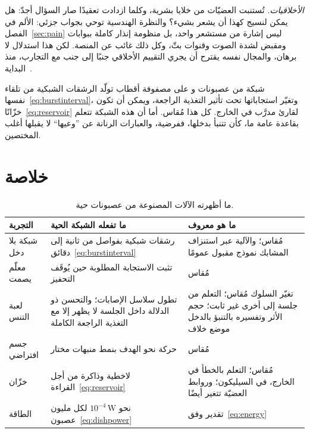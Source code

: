 \emph{الأخلاقيات.} تُستنبت العضيّات من خلايا بشرية، وكلما ازدادت تعقيدًا صار السؤال أجدّ: هل يمكن لنسيج كهذا أن يشعر بشيء؟ والنظرة الهندسية توحي بجواب جزئي: الألم في الفصل~\ref{sec:pain} ليس إشارة من مستشعر واحد، بل منظومة إنذار كاملة ببوابات ومقبض لشدة الصوت وقنوات بثّ، وكل ذلك غائب عن المنصة. لكن هذا استدلال لا برهان، والمجال نفسه يقترح أن يجري التقييم الأخلاقي جنبًا إلى جنب مع التجارب، منذ البداية~\cite{Smirnova2023}.

\begin{keyblock}
\begin{proposition}
\label{prop:livingmachine}
شبكة من عصبونات  و على مصفوفة أقطاب تولّد الرشقات الشبكية من تلقاء نفسها~\eqref{eq:burstinterval}، وتغيّر استجاباتها تحت تأثير التغذية الراجعة، ويمكن أن تكون خزّانًا~\eqref{eq:reservoir} لقارئ مدرَّب في الخارج. كل هذا مُقاس. أما أن هذه الشبكة تتعلم بقاعدة عامة ما، كأن تتنبأ بدخلها، ففرضية، والعبارات الرنانة عن ”وعيها“ لا يقبلها أغلب المختصين.
\end{proposition}
\end{keyblock}



\section{خلاصة}

\begin{table}[t]
\centering
\footnotesize
\setlength{\tabcolsep}{4pt}
\renewcommand{\arraystretch}{1.15}
\begin{tabular}{>{\raggedright}p{2.8cm}>{\raggedright}p{4.2cm}>{\raggedright\arraybackslash}p{5.8cm}}
\toprule
التجربة & ما تفعله الشبكة الحية & ما هو معروف \\
\midrule
شبكة بلا دخل & رشقات شبكية بفواصل من ثانية إلى دقائق~\eqref{eq:burstinterval} & مُقاس؛ والآلية عبر استنزاف المشابك نموذج مقبول عمومًا \\
معلّم يصمت & تثبت الاستجابة المطلوبة حين يُوقَف التحفيز & مُقاس \\
لعبة التنس & تطول سلاسل الإصابات؛ والتحسن ذو الدلالة داخل الجلسة لا يظهر إلا مع التغذية الراجعة الكاملة & تغيّر السلوك مُقاس؛ التعلم من جلسة إلى أخرى غير ثابت؛ حجم الأثر وتفسيره بالتنبؤ بالدخل موضع خلاف \\
جسم افتراضي & حركة نحو الهدف بنمط منبهات مختار & مُقاس \\
خزّان & لاخطية وذاكرة من أجل القراءة~\eqref{eq:reservoir} & مُقاس؛ التعلم بالخطأ في الخارج، في السيليكون؛ وروابط العضيّة تتغير أيضًا \\
الطاقة & نحو $10^{-4}\,\text{W}$ لكل مليون عصبون~\eqref{eq:dishpower} & تقدير وفق~\eqref{eq:energy} \\
\bottomrule
\end{tabular}
\caption{ما أظهرته الآلات المصنوعة من عصبونات حية.}
\label{tab:livingmachine}
\end{table}

